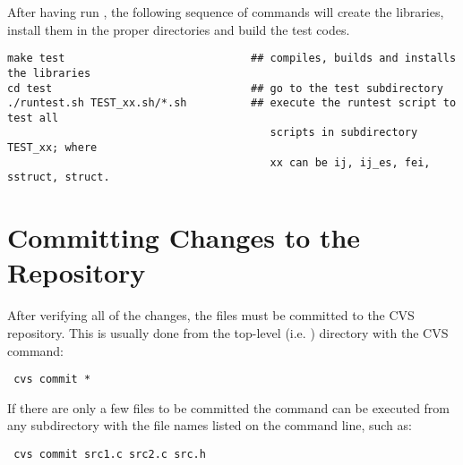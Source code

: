After having run , the following sequence of commands will create 
the \hypre{} libraries, install them in the proper directories and build the test codes.
\begin{verbatim}
make test                             ## compiles, builds and installs the libraries
cd test                               ## go to the test subdirectory
./runtest.sh TEST_xx.sh/*.sh          ## execute the runtest script to test all 
                                         scripts in subdirectory TEST_xx; where 
                                         xx can be ij, ij_es, fei, sstruct, struct.
\end{verbatim}

\section{Committing Changes to the Repository}
\label{Committing Changes to the Repository}

After verifying all of the changes, the files must be committed to the CVS repository.
This is usually done from the top-level (i.e. ) directory with 
the CVS command:
\begin{verbatim} cvs commit * 
\end{verbatim}

If there are only a few files to be committed the command can be executed from 
any subdirectory with the file names listed on the command line, such as:
\begin{verbatim} cvs commit src1.c src2.c src.h
\end{verbatim}
